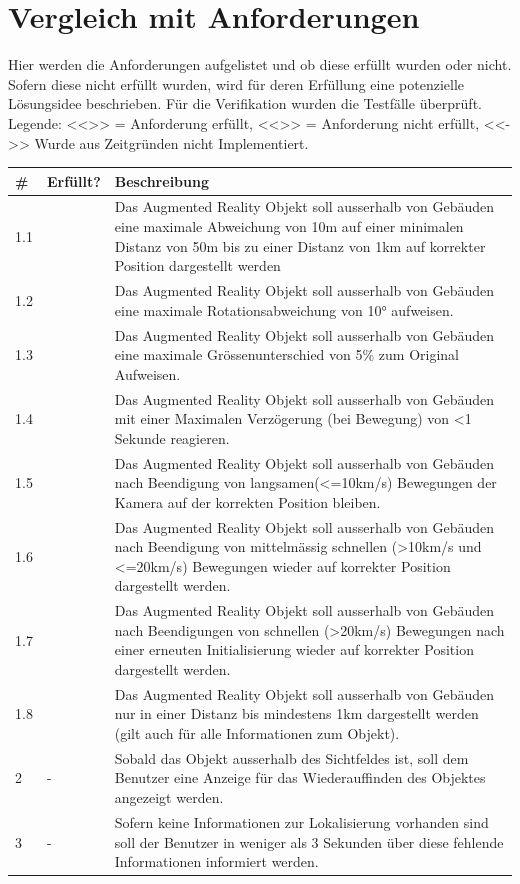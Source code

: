 \documentclass[a4paper]{scrreprt}
\newcommand{\xmark}{\ding{55}}
\begin{document}
\section{Vergleich mit Anforderungen}
\label{sec:VergleichAnforderungen}
Hier werden die Anforderungen aufgelistet und ob diese erfüllt wurden oder nicht. Sofern diese nicht erfüllt wurden, wird für deren Erfüllung eine potenzielle Lösungsidee beschrieben. Für die Verifikation wurden die Testfälle überprüft.
\bigbreak
Legende:
<<\checkmark >> = Anforderung erfüllt, <<\xmark>> = Anforderung nicht erfüllt, <<->> Wurde aus Zeitgründen nicht Implementiert.

\begin{tabularx}{\textwidth}{l l X}
\hline
	\# & \textbf{Erfüllt?} & \textbf{Beschreibung} \\
\hline
	1.1 & \xmark & Das Augmented Reality Objekt soll ausserhalb von Gebäuden eine maximale Abweichung von 10m auf einer minimalen Distanz von 50m bis zu einer Distanz von 1km auf korrekter Position dargestellt werden \\
\hline
	1.2 & \checkmark & Das Augmented Reality Objekt soll ausserhalb von Gebäuden eine maximale Rotationsabweichung von \ang{10} aufweisen.\\
\hline
	1.3 & \checkmark & Das Augmented Reality Objekt soll ausserhalb von Gebäuden eine maximale Grössenunterschied von 5\% zum Original Aufweisen.\\
\hline
	1.4 & \checkmark & Das Augmented Reality Objekt soll ausserhalb von Gebäuden mit einer Maximalen Verzögerung (bei Bewegung) von <1 Sekunde reagieren.\\
\hline
	1.5 & \checkmark & Das Augmented Reality Objekt soll ausserhalb von Gebäuden nach Beendigung von langsamen(<=10km/s) Bewegungen der Kamera auf der korrekten Position bleiben.\\
\hline
	1.6 & \checkmark & Das Augmented Reality Objekt soll ausserhalb von Gebäuden nach Beendigung von mittelmässig schnellen (>10km/s und <=20km/s) Bewegungen wieder auf korrekter Position dargestellt werden.\\
\hline
	1.7 & \checkmark & Das Augmented Reality Objekt soll ausserhalb von Gebäuden nach Beendigungen von schnellen (>20km/s) Bewegungen nach einer erneuten Initialisierung wieder auf korrekter Position dargestellt werden.\\
\hline
	1.8 & \checkmark & Das Augmented Reality Objekt soll ausserhalb von Gebäuden nur in einer Distanz bis mindestens 1km dargestellt werden (gilt auch für alle Informationen zum Objekt).\\
\hline
	2 & - & Sobald das Objekt ausserhalb des Sichtfeldes ist, soll dem Benutzer eine Anzeige für das Wiederauffinden des Objektes angezeigt werden.\\
\hline
	3 & - & Sofern keine Informationen zur Lokalisierung vorhanden sind soll der Benutzer in weniger als 3 Sekunden über diese fehlende Informationen informiert werden. \\
\hline
\end{tabularx}
\end{document}
